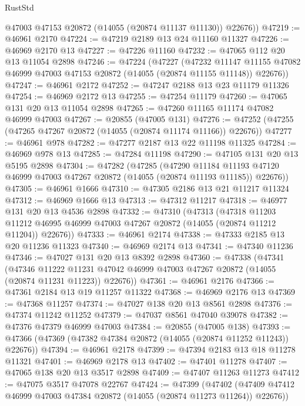 \begin{lexlean}{RustStd}
\begin{coremodule}
        @47003
        @47153
        @20872
        (@14055 (@20874 @11137 @11130))
        @22676))
@47219 := @46961 @2170
@47224 := @47219 @2189 @13 @24 @11160 @11327
@47226 := @46969 @2170 @13
@47227 := @47226 @11160
@47232 := @47065 @112 @20 @13 @11054 @2898
@47246 := @47224
    (@47227
      (@47232
        @11147
        @11155
        @47082
        @46999
        @47003
        @47153
        @20872
        (@14055 (@20874 @11155 @11148))
        @22676))
@47247 := @46961 @2172
@47252 := @47247 @2188 @13 @23 @11179 @11326
@47254 := @46969 @2172 @13
@47255 := @47254 @11179
@47260 := @47065 @131 @20 @13 @11054 @2898
@47265 := @47260 @11165 @11174 @47082 @46999 @47003
@47267 := @20855 (@47005 @131)
@47276 := @47252 (@47255 (@47265 @47267 @20872 (@14055 (@20874 @11174 @11166)) @22676))
@47277 := @46961 @978
@47282 := @47277 @2187 @13 @22 @11198 @11325
@47284 := @46969 @978 @13
@47285 := @47284 @11198
@47290 := @47105 @131 @20 @13 @5195 @2898
@47304 := @47282
    (@47285
      (@47290
        @11184
        @11193
        @47120
        @46999
        @47003
        @47267
        @20872
        (@14055 (@20874 @11193 @11185))
        @22676))
@47305 := @46961 @1666
@47310 := @47305 @2186 @13 @21 @11217 @11324
@47312 := @46969 @1666 @13
@47313 := @47312 @11217
@47318 := @46977 @131 @20 @13 @4536 @2898
@47332 := @47310
    (@47313
      (@47318
        @11203
        @11212
        @46995
        @46999
        @47003
        @47267
        @20872
        (@14055 (@20874 @11212 @11204))
        @22676))
@47333 := @46961 @2174
@47338 := @47333 @2185 @13 @20 @11236 @11323
@47340 := @46969 @2174 @13
@47341 := @47340 @11236
@47346 := @47027 @131 @20 @13 @8392 @2898
@47360 := @47338
    (@47341
      (@47346
        @11222
        @11231
        @47042
        @46999
        @47003
        @47267
        @20872
        (@14055 (@20874 @11231 @11223))
        @22676))
@47361 := @46961 @2176
@47366 := @47361 @2184 @13 @19 @11257 @11322
@47368 := @46969 @2176 @13
@47369 := @47368 @11257
@47374 := @47027 @138 @20 @13 @8561 @2898
@47376 := @47374 @11242 @11252
@47379 := @47037 @8561 @47040 @39078
@47382 := @47376 @47379 @46999 @47003
@47384 := @20855 (@47005 @138)
@47393 := @47366 (@47369 (@47382 @47384 @20872 (@14055 (@20874 @11252 @11243)) @22676))
@47394 := @46961 @2178
@47399 := @47394 @2183 @13 @18 @11278 @11321
@47401 := @46969 @2178 @13
@47402 := @47401 @11278
@47407 := @47065 @138 @20 @13 @3517 @2898
@47409 := @47407 @11263 @11273
@47412 := @47075 @3517 @47078 @22767
@47424 := @47399
    (@47402 (@47409 @47412 @46999 @47003 @47384 @20872 (@14055 (@20874 @11273 @11264)) @22676))

\end{coremodule}
\end{lexlean}

